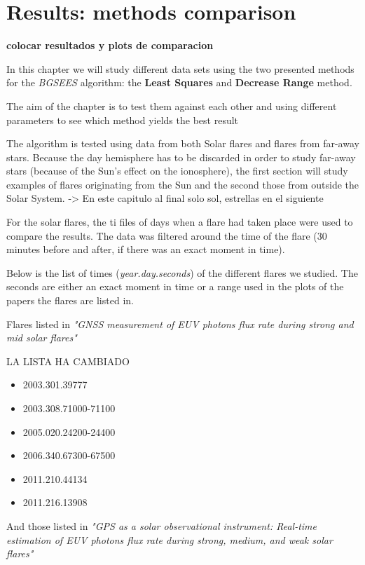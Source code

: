 \chapter{Results: methods comparison}

\textbf{colocar resultados y plots de comparacion}

In this chapter we will study different data sets using the two presented methods for the \textit{BGSEES} algorithm: the \textbf{Least Squares} and \textbf{Decrease Range} method. 

The aim of the chapter is to test them against each other and using different parameters to see which method yields the best result

The algorithm is tested using data from both Solar flares and flares from far-away stars. Because the day hemisphere has to be discarded in order to study far-away stars (because of the Sun's effect on the ionosphere), the first section will study examples of flares originating from the Sun and the second those from outside the Solar System. -> En este capitulo al final solo sol, estrellas en el siguiente

For the solar flares, the ti files of days when a flare had taken place were used to compare the results. The data was filtered around the time of the flare (30 minutes before and after, if there was an exact moment in time).
 
Below is the list of times (\textit{year.day.seconds}) of the different flares we studied. The seconds are either an exact moment in time or a range used in the plots of the papers the flares are listed in.

Flares listed in \textit{"GNSS measurement of EUV photons flux rate during strong and mid solar flares"}\cite{hernandez2012gnss}

LA LISTA HA CAMBIADO

\begin{itemize}
	\item 2003.301.39777
	\item 2003.308.71000-71100
	\item 2005.020.24200-24400
	\item 2006.340.67300-67500
	\item 2011.210.44134
	\item 2011.216.13908
\end{itemize}

And those listed in \textit{"GPS as a solar observational instrument: Real-time estimation of EUV photons flux rate during strong, medium, and weak solar flares"}\cite{singh2015gps}

